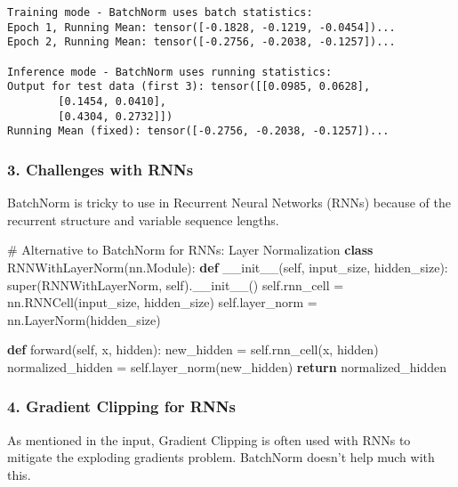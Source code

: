 \documentclass[
  letterpaper,
  DIV=11,
  numbers=noendperiod]{scrreprt}
\newenvironment{Shaded}{\begin{snugshade}}{\end{snugshade}}
\newcommand{\BuiltInTok}[1]{\textcolor[rgb]{0.00,0.23,0.31}{#1}}
\newcommand{\CommentTok}[1]{\textcolor[rgb]{0.37,0.37,0.37}{#1}}
\newcommand{\ControlFlowTok}[1]{\textcolor[rgb]{0.00,0.23,0.31}{\textbf{#1}}}
\newcommand{\FunctionTok}[1]{\textcolor[rgb]{0.28,0.35,0.67}{#1}}
\newcommand{\KeywordTok}[1]{\textcolor[rgb]{0.00,0.23,0.31}{\textbf{#1}}}
\newcommand{\NormalTok}[1]{\textcolor[rgb]{0.00,0.23,0.31}{#1}}
\newcommand{\OperatorTok}[1]{\textcolor[rgb]{0.37,0.37,0.37}{#1}}
\newcommand{\VariableTok}[1]{\textcolor[rgb]{0.07,0.07,0.07}{#1}}
\begin{document}
\begin{verbatim}
Training mode - BatchNorm uses batch statistics:
Epoch 1, Running Mean: tensor([-0.1828, -0.1219, -0.0454])...
Epoch 2, Running Mean: tensor([-0.2756, -0.2038, -0.1257])...

Inference mode - BatchNorm uses running statistics:
Output for test data (first 3): tensor([[0.0985, 0.0628],
        [0.1454, 0.0410],
        [0.4304, 0.2732]])
Running Mean (fixed): tensor([-0.2756, -0.2038, -0.1257])...
\end{verbatim}

\subsubsection{3. Challenges with RNNs}\label{challenges-with-rnns}

BatchNorm is tricky to use in Recurrent Neural Networks (RNNs) because
of the recurrent structure and variable sequence lengths.

\begin{Shaded}
\begin{Highlighting}[]
\CommentTok{\# Alternative to BatchNorm for RNNs: Layer Normalization}
\KeywordTok{class}\NormalTok{ RNNWithLayerNorm(nn.Module):}
    \KeywordTok{def} \FunctionTok{\_\_init\_\_}\NormalTok{(}\VariableTok{self}\NormalTok{, input\_size, hidden\_size):}
        \BuiltInTok{super}\NormalTok{(RNNWithLayerNorm, }\VariableTok{self}\NormalTok{).}\FunctionTok{\_\_init\_\_}\NormalTok{()}
        \VariableTok{self}\NormalTok{.rnn\_cell }\OperatorTok{=}\NormalTok{ nn.RNNCell(input\_size, hidden\_size)}
        \VariableTok{self}\NormalTok{.layer\_norm }\OperatorTok{=}\NormalTok{ nn.LayerNorm(hidden\_size)}
        
    \KeywordTok{def}\NormalTok{ forward(}\VariableTok{self}\NormalTok{, x, hidden):}
\NormalTok{        new\_hidden }\OperatorTok{=} \VariableTok{self}\NormalTok{.rnn\_cell(x, hidden)}
\NormalTok{        normalized\_hidden }\OperatorTok{=} \VariableTok{self}\NormalTok{.layer\_norm(new\_hidden)}
        \ControlFlowTok{return}\NormalTok{ normalized\_hidden}
\end{Highlighting}
\end{Shaded}

\subsubsection{4. Gradient Clipping for
RNNs}\label{gradient-clipping-for-rnns}

As mentioned in the input, Gradient Clipping is often used with RNNs to
mitigate the exploding gradients problem. BatchNorm doesn't help much
with this.
\end{document}
